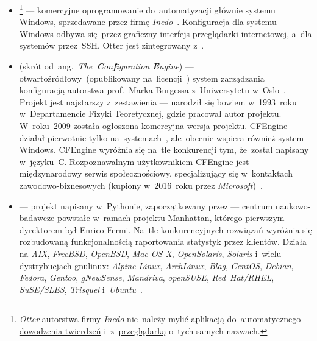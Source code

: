 \documentclass[thesis]{subfiles}
\begin{document}
\begin{itemize}
	\item {}\footnote{\emph{Otter} autorstwa firmy \emph{Inedo} nie~należy mylić \href{https://en.wikipedia.org/wiki/Prover9\#Predecessor}{aplikacją do~automatycznego dowodzenia twierdzeń} i~z~\href{https://pl.wikipedia.org/wiki/Otter\_Browser}{przeglądarką} o~tych samych nazwach.} --- komercyjne oprogramowanie do~automatyzacji głównie systemu Windows, sprzedawane przez firmę \emph{Inedo}~\cite{otter}. Konfiguracja dla systemu Windows odbywa się~przez graficzny interfejs przeglądarki internetowej, a~dla systemów  przez~SSH. Otter jest zintegrowany z~.
	\item\label{itm:cfengine}  (skrót od~ang.~\emph{The~\textbf{C}on\textbf{f}iguration \textbf{E}ngine}) --- otwartoźródłowy~(opublikowany na~licencji~) system zarządzania konfiguracją autorstwa \href{https://en.wikipedia.org/wiki/Mark_Burgess_(computer_scientist)}{prof.~Marka Burgessa} z~Uniwersytetu w~Oslo~\cite{cfengine}. Projekt jest najstarszy z~zestawienia --- narodził się bowiem w~1993~roku w~Departamencie Fizyki Teoretycznej, gdzie pracował autor projektu. W~roku~2009 została ogłoszona komercyjna wersja projektu. CFEngine działał pierwotnie tylko na~systemach~, ale~obecnie wspiera również system Windows. CFEngine wyróżnia się na~tle konkurencji tym, że~został napisany w~języku~C. Rozpoznawalnym użytkownikiem CFEngine jest  --- międzynarodowy serwis społecznościowy, specjalizujący się w~kontaktach zawodowo-biznesowych (kupiony w~2016~roku przez \emph{Microsoft})~\cite{cfengine-linkedin}.
	\item\label{itm:bcfg2}  --- projekt napisany w~Pythonie, zapoczątkowany przez  --- centrum naukowo-badawcze powstałe w~ramach \href{https://en.wikipedia.org/wiki/Manhattan_Project}{projektu Manhattan}, którego pierwszym dyrektorem był \href{https://en.wikipedia.org/wiki/Enrico_Fermi}{Enrico Fermi}. Na~tle konkurencyjnych rozwiązań wyróżnia się rozbudowaną funkcjonalnością raportowania statystyk przez klientów. Działa na \emph{AIX}, \emph{FreeBSD}, \emph{OpenBSD}, \emph{Mac OS X}, \emph{OpenSolaris}, \emph{Solaris} i~wielu dystrybucjach \gls{gnulinux}: \emph{Alpine Linux}, \emph{ArchLinux}, \emph{Blag}, \emph{CentOS}, \emph{Debian}, \emph{Fedora}, \emph{Gentoo}, \emph{gNewSense}, \emph{Mandriva}, \emph{openSUSE}, \emph{Red~Hat/RHEL}, \emph{SuSE/SLES}, \emph{Trisquel} i~\emph{Ubuntu}~\cite{bcfg2}.
\end{itemize}
\end{document}

